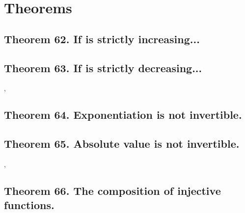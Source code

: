 \documentclass[preview]{standalone}
\begin{document}
\section{Theorems}


\subsection[\texorpdfstring{$\gamma [\alpha]$ is strictly increasing...}
        {If a function is strictly increasing...}
    ]{
        \color{section}Theorem 62. \color{black} If \bm{$\gamma [\alpha]$} is strictly increasing...
    }

\pagebreak


\subsection[\texorpdfstring{$\gamma [\alpha]$ is strictly decreasing...}
        {If a function is strictly decreasing...}
    ]{
        \color{section}Theorem 63. \color{black} If \bm{$\gamma [\alpha]$} is strictly decreasing...
    }

\sep


\subsection[Exponentiation is not invertible.]
    {
        \color{section}Theorem 64. \color{black} Exponentiation is not invertible.
    }

\pagebreak


\subsection[Absolute value is not invertible.]
    {
        \color{section}Theorem 65. \color{black} Absolute value is not invertible.
    }

\sep


\subsection[The composition of injective functions is injective.]
    {
        \color{section}Theorem 66. \color{black} The composition of injective functions.
    }

\pagebreak
\end{document}
